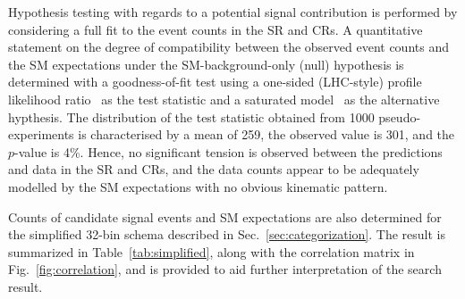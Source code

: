 Hypothesis testing with regards to a potential signal contribution is
performed by considering a full fit to the event counts in the SR and
CRs. A quantitative statement on the degree of compatibility between
the observed event counts and the SM expectations under the
SM-background-only (null) hypothesis is determined with a
goodness-of-fit test using a one-sided (LHC-style) profile likelihood
ratio~\cite{CMS-NOTE-2011-005} as the test statistic and a saturated
model~\cite{sat-llk} as the alternative hypthesis. The distribution of
the test statistic obtained from 1000 pseudo-experiments is
characterised by a mean of 259, the observed value is 301, and the
$p$-value is 4\%. Hence, no significant tension is observed between
the predictions and data in the SR and CRs, and the data counts appear
to be adequately modelled by the SM expectations with no obvious
kinematic pattern.

Counts of candidate signal events and SM expectations are also
determined for the simplified 32-bin schema described in
Sec.~\ref{sec:categorization}. The result is summarized in
Table~\ref{tab:simplified}, along with the correlation matrix in
Fig.~\ref{fig:correlation}, and is provided to aid further
interpretation of the search result.

